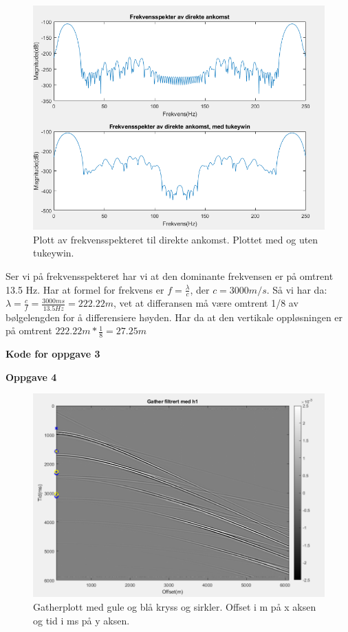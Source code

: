 \documentclass[11pt]{article}
\begin{document}
\begin{figure}[H]
\includegraphics[scale=0.8]{3b_ankomstspek.png}
\caption{Plott av frekvensspekteret til direkte ankomst. Plottet med og uten tukeywin.}
\end{figure}

Ser vi på frekvensspekteret har vi at den dominante frekvensen er på omtrent 13.5 Hz.
Har at formel for frekvens er $f = \frac{\lambda}{c}$, der $c = 3000m/s$. Så vi har da: $\lambda = \frac{c}{f}= \frac{3000ms}{13.5Hz} = 222.22m$, vet at differansen må være omtrent 1/8 av bølgelengden for å differensiere høyden. Har da at den vertikale oppløsningen er på omtrent $222.22m*\frac{1}{8}=27.25m$

\textbf{Kode for oppgave 3}

\textbf{Oppgave 4}
\begin{figure}[H]
\includegraphics[scale=0.7]{4a_multippel.png}
\caption{Gatherplott med gule og blå kryss og sirkler. Offset i m på x aksen og tid i ms på y aksen.}
\end{figure}
\end{document}
